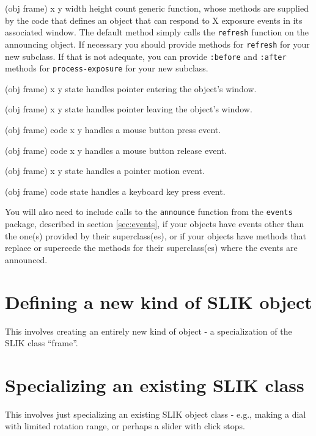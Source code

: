 \documentclass[twoside,openright,11pt]{report}
\newcommand{\tp}[1]{\texttt{#1}}
\begin{document}
{(obj frame) x y width height count}
{generic function, whose methods are supplied by the code that defines
an object that can respond to X exposure events in its associated
window.  The default method simply calls the \tp{refresh} function
on the announcing object.  If necessary you should provide methods for
\tp{refresh} for your new subclass.  If that is not adequate, you
can provide \tp{:before} and \tp{:after} methods for
\tp{process-exposure} for your new subclass.}

{(obj frame) x y state}
{handles pointer entering the object's window.}

{(obj frame) x y state}
{handles pointer leaving the object's window.}

{(obj frame) code x y}
{handles a mouse button press event.}

{(obj frame) code x y}
{handles a mouse button release event.}

{(obj frame) x y state}
{handles a pointer motion event.}

{(obj frame) code state}
{handles a keyboard key press event.}

You will also need to include calls to the \tp{announce} function
from the \tp{events} package, described in section
\ref{sec:events}, if your objects have events other than the one(s)
provided by their superclass(es), or if your objects have methods that
replace or supercede the methods for their superclass(es) where the
events are announced.

\section{Defining a new kind of SLIK object}

This involves creating an entirely new kind of object - a
specialization of the SLIK class ``frame''.

\section{Specializing an existing SLIK class}

This involves just specializing an existing SLIK object class - e.g.,
making a dial with limited rotation range, or perhaps a slider with
click stops.




\cleardoublepage

\printindex
\end{document}
